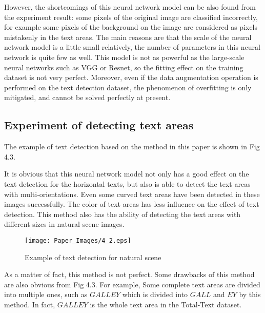 \documentclass[22pt, UTF8]{article}
\numberwithin{figure}{section}
\numberwithin{table}{section}
\numberwithin{equation}{section} %
\begin{document}
\setlength\parindent{2em} However, the shortcomings of this neural network model can be also found from the experiment result: some pixels of the original image are classified incorrectly, for example some pixels of the background on the image are considered as pixels mistakenly in the text areas. The main reasons are that the scale of the neural network model is a little small relatively, the number of parameters in this neural network is quite few as well. This model is not as powerful as the large-scale neural networks such as VGG or Resnet, so the fitting effect on the training dataset is not very perfect. Moreover, even if the data augmentation operation is performed on the text detection dataset, the phenomenon of overfitting is only mitigated, and cannot be solved perfectly at present.

\subsection{Experiment of detecting text areas}

\setlength\parindent{2em} The example of text detection based on the method in this paper is shown in Fig 4.3.

\setlength\parindent{2em} It is obvious that this neural network model not only has a good effect on the text detection for the horizontal texts, but also is able to detect the text areas with multi-orientations. Even some curved text areas have been detected in these images successfully. The color of text areas has less influence on the effect of text detection. This method also has the ability of detecting the text areas with different sizes in natural scene images.

\begin{figure}[htbp]
    \begin{center}
        \texttt{[image: Paper\_Images/4\_2.eps]}
    \end{center}
    \vspace{-3mm} %
    \caption{Example of text detection for natural scene}
    \vspace{-4mm} %
\end{figure}

\setlength\parindent{2em} As a matter of fact, this method is not perfect. Some drawbacks of this method are also obvious from Fig 4.3. For example, Some complete text areas are divided into multiple ones, such as $GALLEY$ which is divided into $GALL$ and $EY$ by this method. In fact, $GALLEY$ is the whole text area in the Total-Text dataset.
\end{document}
